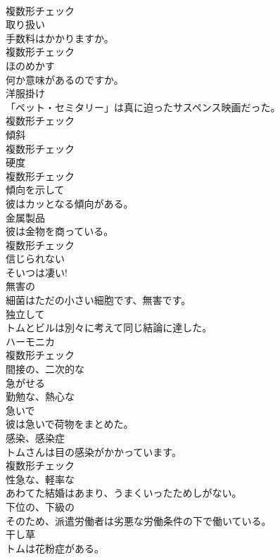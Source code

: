 \documentclass[8pt]{extreport}
\begin{document}
\begin{CJK}{UTF8}{min}
\\	複数形チェック
\\	[名詞]	取り扱い	
\\	手数料はかかりますか。	
\\	複数形チェック
\\	[動詞]	ほのめかす	
\\	何か意味があるのですか。	
\\	[名詞]	洋服掛け	
\\	「ペット・セミタリー」は真に迫ったサスペンス映画だった。	
\\	複数形チェック
\\	[名詞]	傾斜	
\\	複数形チェック
\\	[名詞]	硬度	
\\	複数形チェック
\\	[形容詞]	傾向を示して	
\\	彼はカッとなる傾向がある。	
\\	[名詞]	金属製品	
\\	彼は金物を商っている。	
\\	複数形チェック
\\	[形容詞]	信じられない	
\\	そいつは凄い!	
\\	[形容詞]	無害の	
\\	細菌はただの小さい細胞です、無害です。	
\\	[副詞]	独立して	
\\	トムとビルは別々に考えて同じ結論に達した。	
\\	[名詞]	ハーモニカ	
\\	複数形チェック
\\	[形容詞]	間接の、二次的な	
\\	[動詞]	急がせる	
\\	[形容詞]	勤勉な、熱心な	
\\	[副詞]	急いで	
\\	彼は急いで荷物をまとめた。	
\\	[名詞]	感染、感染症	
\\	トムさんは目の感染がかかっています。	
\\	複数形チェック
\\	[形容詞]	性急な、軽率な	
\\	あわてた結婚はあまり、うまくいったためしがない。	
\\	[形容詞]	下位の、下級の	
\\	そのため、派遣労働者は劣悪な労働条件の下で働いている。	
\\	[名詞]	干し草	
\\	トムは花粉症がある。	

\end{CJK}
\end{document}
